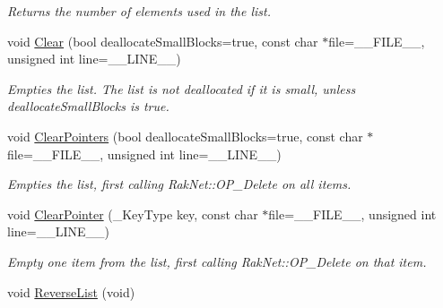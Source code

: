 \begin{DoxyCompactItemize}
\begin{DoxyCompactList}\small\item\em Returns the number of elements used in the list. \end{DoxyCompactList}\item 
\hypertarget{class_data_structures_1_1_multilist_a837e5a1793a397c26580de337c4a4207}{void \hyperlink{class_data_structures_1_1_multilist_a837e5a1793a397c26580de337c4a4207}{Clear} (bool deallocate\-Small\-Blocks=true, const char $\ast$file=\-\_\-\-\_\-\-F\-I\-L\-E\-\_\-\-\_\-, unsigned int line=\-\_\-\-\_\-\-L\-I\-N\-E\-\_\-\-\_\-)}\label{class_data_structures_1_1_multilist_a837e5a1793a397c26580de337c4a4207}

\begin{DoxyCompactList}\small\item\em Empties the list. The list is not deallocated if it is small, unless {\itshape deallocate\-Small\-Blocks} is true. \end{DoxyCompactList}\item 
void \hyperlink{class_data_structures_1_1_multilist_a8ea6e9cc49fa6c858114db3540264d7b}{Clear\-Pointers} (bool deallocate\-Small\-Blocks=true, const char $\ast$file=\-\_\-\-\_\-\-F\-I\-L\-E\-\_\-\-\_\-, unsigned int line=\-\_\-\-\_\-\-L\-I\-N\-E\-\_\-\-\_\-)
\begin{DoxyCompactList}\small\item\em Empties the list, first calling Rak\-Net\-::\-O\-P\-\_\-\-Delete on all items. \end{DoxyCompactList}\item 
\hypertarget{class_data_structures_1_1_multilist_a4d96ab0baeb2c566f3f5e0c20be880ed}{void \hyperlink{class_data_structures_1_1_multilist_a4d96ab0baeb2c566f3f5e0c20be880ed}{Clear\-Pointer} (\-\_\-\-Key\-Type key, const char $\ast$file=\-\_\-\-\_\-\-F\-I\-L\-E\-\_\-\-\_\-, unsigned int line=\-\_\-\-\_\-\-L\-I\-N\-E\-\_\-\-\_\-)}\label{class_data_structures_1_1_multilist_a4d96ab0baeb2c566f3f5e0c20be880ed}

\begin{DoxyCompactList}\small\item\em Empty one item from the list, first calling Rak\-Net\-::\-O\-P\-\_\-\-Delete on that item. \end{DoxyCompactList}\item 
\hypertarget{class_data_structures_1_1_multilist_a1b8cc2c4515e66ace8a1efe3d045eaf0}{void \hyperlink{class_data_structures_1_1_multilist_a1b8cc2c4515e66ace8a1efe3d045eaf0}{Reverse\-List} (void)}\label{class_data_structures_1_1_multilist_a1b8cc2c4515e66ace8a1efe3d045eaf0}


\end{DoxyCompactItemize}
